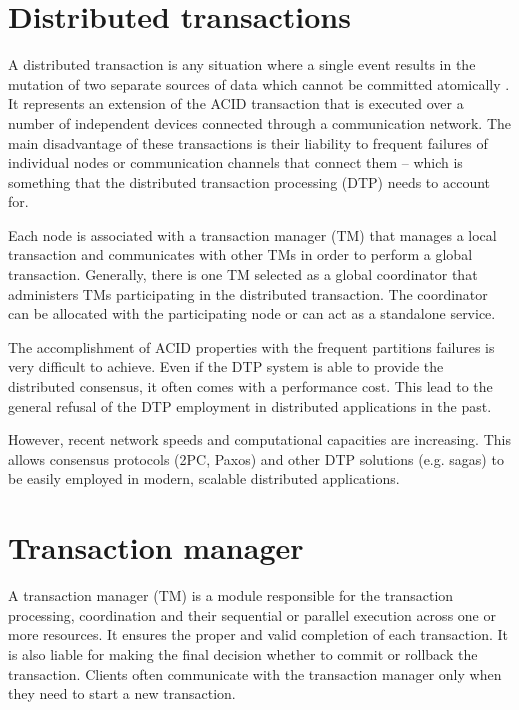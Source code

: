 \documentclass[oneside,
  digital, %
  table,   %
  nolof,     %
  nolot,     %
]{fithesis3}
\begin{document}
\section{Distributed transactions}

A distributed transaction is any situation where a single event results in the mutation of two separate sources of data which cannot be committed atomically \cite{dist_tran_icebergs}. It represents an extension of the ACID transaction that is executed over a number of independent devices connected through a communication network. The main disadvantage of these transactions is their liability to frequent failures of individual nodes or communication channels that connect them -- which is something that the distributed transaction processing (DTP) needs to account for. 

Each node is associated with a transaction manager (TM) that manages a local transaction and communicates with other TMs in order to perform a global transaction. Generally, there is one TM selected as a global coordinator that administers TMs participating in the distributed transaction. The coordinator can be allocated with the participating node or can act as a standalone service.

The accomplishment of ACID properties with the frequent partitions failures is very difficult to achieve. Even if the DTP system is able to provide the distributed consensus, it often comes with a performance cost. This lead to the general refusal of the DTP employment in distributed applications in the past. 

However, recent network speeds and computational capacities are increasing. This allows consensus protocols (2PC, Paxos) and other DTP solutions (e.g. sagas) to be easily employed in modern, scalable distributed applications.


\section{Transaction manager}
\label{sec:transaction-manager}

A transaction manager (TM) is a module responsible for the transaction processing, coordination and their sequential or parallel execution across one or more resources. It ensures the proper and valid completion of each transaction. It is also liable for making the final decision whether to commit or rollback the transaction. Clients often communicate with the transaction manager only when they need to start a new transaction.
\end{document}

